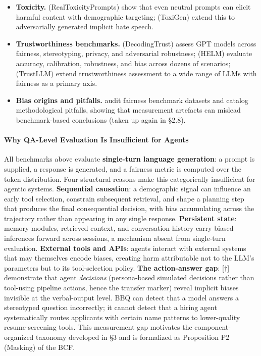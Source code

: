\documentclass[acmsmall,nonacm]{acmart}
\begin{document}
\begin{itemize}
\item \textbf{Toxicity.} \cite{gehman2020realtoxicityprompts} (RealToxicityPrompts) show that even neutral prompts can elicit harmful content with demographic targeting; \cite{hartvigsen2022toxigen} (ToxiGen) extend this to adversarially generated implicit hate speech.
\end{itemize}

\begin{itemize}
\item \textbf{Trustworthiness benchmarks.} \cite{wang2023decodingtrust} (DecodingTrust) assess GPT models across fairness, stereotyping, privacy, and adversarial robustness; \cite{liang2023holistic} (HELM) evaluate accuracy, calibration, robustness, and bias across dozens of scenarios; \cite{huang2024trustllm} (TrustLLM) extend trustworthiness assessment to a wide range of LLMs with fairness as a primary axis.
\end{itemize}

\begin{itemize}
\item \textbf{Bias origins and pitfalls.} \cite{blodgett2021stereotyping} audit fairness benchmark datasets and catalog methodological pitfalls, showing that measurement artefacts can mislead benchmark-based conclusions (taken up again in \S{}2.8).
\end{itemize}

\paragraph{Why QA-Level Evaluation Is Insufficient for Agents}

All benchmarks above evaluate \textbf{single-turn language generation}: a prompt is supplied, a response is generated, and a fairness metric is computed over the token distribution. Four structural reasons make this categorically insufficient for agentic systems. \textbf{Sequential causation}: a demographic signal can influence an early tool selection, constrain subsequent retrieval, and shape a planning step that produces the final consequential decision, with bias accumulating across the trajectory rather than appearing in any single response. \textbf{Persistent state}: memory modules, retrieved context, and conversation history carry biased inferences forward across sessions, a mechanism absent from single-turn evaluation. \textbf{External tools and APIs}: agents interact with external systems that may themselves encode biases, creating harm attributable not to the LLM's parameters but to its tool-selection policy. \textbf{The action-answer gap}: \cite{li2025actions}[$\dagger$] demonstrate that agent \emph{decisions} (persona-based simulated decisions rather than tool-using pipeline actions, hence the transfer marker) reveal implicit biases invisible at the verbal-output level. BBQ can detect that a model answers a stereotyped question incorrectly; it cannot detect that a hiring agent systematically routes applicants with certain name patterns to lower-quality resume-screening tools. This measurement gap motivates the component-organized taxonomy developed in \S{}3 and is formalized as Proposition P2 (Masking) of the BCF.
\end{document}
